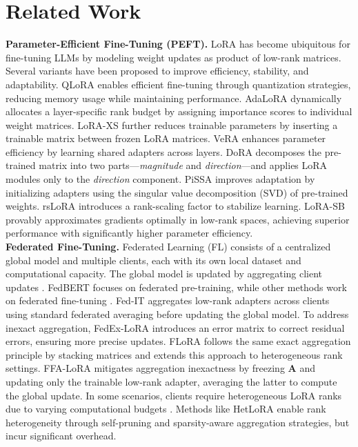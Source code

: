 \section{Related Work}
\textbf{Parameter-Efficient Fine-Tuning (PEFT).}  
LoRA \citep{lora} has become ubiquitous for fine-tuning LLMs \citep{scaling_llm} by modeling weight updates as product of low-rank matrices. 
Several variants have been proposed to improve efficiency, stability, and adaptability.  
QLoRA \citep{qlora} enables efficient fine-tuning through quantization strategies, reducing memory usage while maintaining performance.  
AdaLoRA \citep{adalora} dynamically allocates a layer-specific rank budget by assigning importance scores to individual weight matrices.  
LoRA-XS \citep{bałazy2024loraxslowrankadaptationextremely} further reduces trainable parameters by inserting a trainable matrix between frozen LoRA matrices.  
VeRA \citep{kopiczko2024veravectorbasedrandommatrix} enhances parameter efficiency by learning shared adapters across layers.  
DoRA \citep{liu2024doraweightdecomposedlowrankadaptation} decomposes the pre-trained matrix into two parts—\textit{magnitude} and \textit{direction}—and applies LoRA modules only to the \textit{direction} component.  
PiSSA \citep{meng2024pissaprincipalsingularvalues} improves adaptation by initializing adapters using the singular value decomposition (SVD) of pre-trained weights.  
rsLoRA \citep{rslora} introduces a rank-scaling factor to stabilize learning.  
LoRA-SB \citep{ponkshe2024initialization} provably approximates gradients optimally in low-rank spaces, achieving superior performance with significantly higher parameter efficiency.
\\

\textbf{Federated Fine-Tuning.}
Federated Learning (FL) consists of a centralized global model and multiple clients, each with its own local dataset and computational capacity. 
The global model is updated by aggregating client updates \citep{kairouz2021advances}.  
FedBERT \citep{tian2022fedbert} focuses on federated pre-training, while other methods work on federated fine-tuning \citep{zhang2022federated, kuang2024federatedscope, babakniya2023slora}.  
Fed-IT \citep{zhang2024buildingfederatedgptfederated} aggregates low-rank adapters across clients using standard federated averaging \citep{mcmahan2017communication} before updating the global model.  
To address inexact aggregation, FedEx-LoRA \citep{singhal2024exact} introduces an error matrix to correct residual errors, ensuring more precise updates.  
FLoRA \citep{wang2024flora} follows the same exact aggregation principle by stacking matrices and extends this approach to heterogeneous rank settings.  
FFA-LoRA \citep{sun2024improving} mitigates aggregation inexactness by freezing \( \mathbf{A} \) and updating only the trainable low-rank adapter, averaging the latter to compute the global update.  
In some scenarios, clients require heterogeneous LoRA ranks due to varying computational budgets \citep{zhao2018federated, li2019convergence}.  
Methods like HetLoRA \citep{hetero_lora} enable rank heterogeneity through self-pruning and sparsity-aware aggregation strategies, but incur significant overhead.
\\

